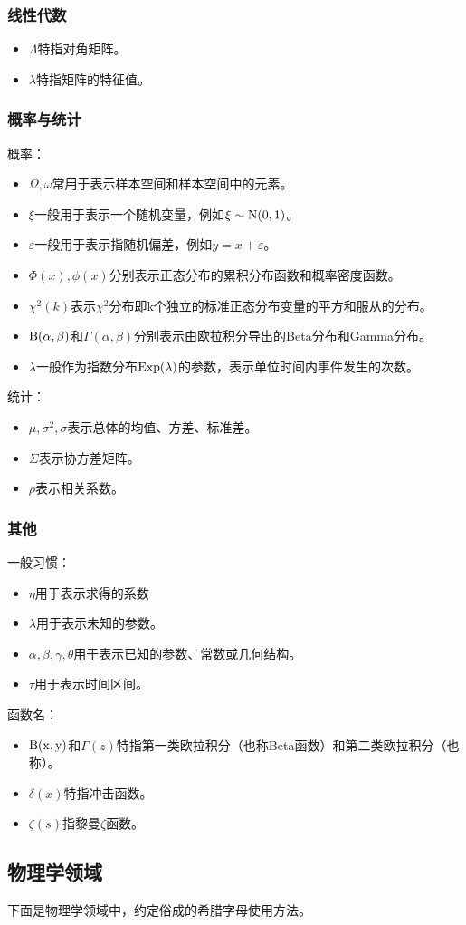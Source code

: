 \subsubsection{线性代数}

\begin{itemize}
\item $\Lambda$特指对角矩阵。
\item $\lambda$特指矩阵的特征值。
\end{itemize}

\subsubsection{概率与统计}

概率：
\begin{itemize}
\item $\Omega,\omega$常用于表示样本空间和样本空间中的元素。
\item $\xi$一般用于表示一个随机变量，例如$\xi\sim{\rm N}(0,1)$。
\item $\varepsilon$一般用于表示指随机偏差，例如$y=x+\varepsilon$。
\item $\Phi(x),\phi(x)$分别表示正态分布的累积分布函数和概率密度函数。
\item $\chi^2(k)$表示$\chi^2$分布即k个独立的标准正态分布变量的平方和服从的分布。
\item ${\rm B(\alpha,\beta)}$和$\Gamma (\alpha,\beta)$分别表示由欧拉积分导出的Beta分布和Gamma分布。
\item $\lambda$一般作为指数分布${\rm Exp}(\lambda)$的参数，表示单位时间内事件发生的次数。
\end{itemize}

统计：
\begin{itemize}
\item $\mu,\sigma^2,\sigma$表示总体的均值、方差、标准差。
\item $\Sigma$表示协方差矩阵。
\item $\rho$表示相关系数。
\end{itemize}


\subsubsection{其他}

一般习惯：

\begin{itemize}
\item $\eta$用于表示求得的系数
\item $\lambda$用于表示未知的参数。
\item $\alpha,\beta,\gamma,\theta$用于表示已知的参数、常数或几何结构。
\item $\tau$用于表示时间区间。
\end{itemize}

函数名：

\begin{itemize}
\item ${\rm B(x,y)}$和${\Gamma (z)}$特指第一类欧拉积分（也称Beta函数）和第二类欧拉积分（也称）。
\item $\delta(x)$特指冲击函数。
\item $\zeta(s)$指黎曼$\zeta$函数。
\end{itemize}

\subsection{物理学领域}

下面是物理学领域中，约定俗成的希腊字母使用方法。